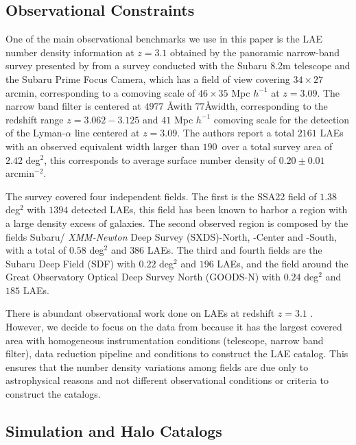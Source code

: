 \documentclass[usenatbib]{mn2e}
\begin{document}
\subsection{Observational Constraints}

One of the main observational benchmarks we use in this paper is the LAE number
density information at $z=3.1$ obtained by the panoramic narrow-band
survey presented by \cite{Yamada2012} from a survey  conducted with
the Subaru 8.2m telescope and the Subaru Prime Focus Camera, which has
a field of view covering $34\times 27$ arcmin, corresponding to a
comoving scale of $46\times35$ Mpc $h^{-1}$ at $z=3.09$. The narrow
band filter is centered at $4977$ \AA with  $77$\AA width,
corresponding to the redshift range $z=3.062-3.125$ and $41$ Mpc
$h^{-1}$ comoving scale for the detection of the Lyman-$\alpha$ line
centered at $z=3.09$. The authors report a total  $2161$ LAEs with an
observed equivalent width larger than $190$\ over a total survey area
of $2.42$ deg$^{2}$, this corresponds to  average surface number
density of $0.20\pm 0.01$ arcmin$^{-2}$.   

The survey covered four independent fields. The first is the SSA22
field of $1.38$ deg$^2$ with $1394$ detected LAEs, this field has been
known to harbor a region with a large density excess of galaxies. The
second observed region is composed by the fields Subaru/{\it
  XMM-Newton} Deep Survey (SXDS)-North, -Center and -South, with a 
total of $0.58$ deg$^2$ and $386$ LAEs. The third and fourth fields
are the Subaru Deep Field (SDF) with $0.22$ deg$^2$ and $196$ LAEs,
and the field around the Great Observatory Optical Deep Survey North
(GOODS-N) with $0.24$ deg$^2$ and $185$ LAEs. 

There is abundant observational work done on LAEs at redshift $z=3.1$
\citep{Kudritzki2000,Matsuda2005,Gawiser2007,Nilsson2007,Ouchi2008}.
However, we decide to focus on the data from \cite{Yamada2012} because
it has the largest covered area with homogeneous instrumentation
conditions (telescope, narrow band filter), data reduction pipeline
and conditions to construct the LAE catalog. This ensures that the
number density variations among fields are due only to
astrophysical reasons and not different observational conditions or
criteria to construct the catalogs.



\subsection{Simulation and Halo Catalogs}
\end{document}
